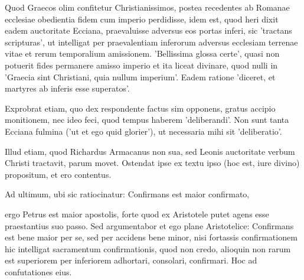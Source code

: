 Quod Graecos olim confitetur Christianissimos, postea recedentes ab Romanae ecclesiae obedientia fidem cum imperio perdidisse, idem est, quod heri dixit eadem auctoritate Ecciana, praevaluisse adversus eos portas inferi, sic 'tractans scripturas', ut intelligat per praevalentiam inferorum adversus ecclesiam terrenae vitae et rerum temporalium amissionem. 'Bellissima glossa certe', quasi non potuerit fides permanere amisso imperio et ita liceat divinare, quod nulli in 'Graecia sint Christiani, quia nullum imperium'. Eadem ratione 'diceret, et martyres ab inferis esse superatos'.

Exprobrat etiam, quo dex respondente factus sim opponens, gratus accipio monitionem, nec ideo feci, quod tempus haberem 'deliberandi'. Non sunt tanta Ecciana fulmina ('ut et ego quid glorier'), ut necessaria mihi sit 'deliberatio'.

Illud etiam, quod Richardus Armacanus non sua, sed Leonis auctoritate verbum Christi tractavit, parum movet. Ostendat ipse ex textu ipso (hoc est, iure divino) propositum, et ero contentus.

Ad ultimum, ubi sic ratiocinatur: Confirmans est maior confirmato,

ergo Petrus est maior apostolis, forte quod ex Aristotele putet agens esse praestantius suo passo. Sed argumentabor et ego plane Aristotelice: Confirmans est bene maior per se, sed per accidens bene minor, nisi fortassis confirmationem hic intelligat sacramentum confirmationis, quod non credo, alioquin non rarum est superiorem per inferiorem adhortari, consolari, confirmari. Hoc ad confutationes eius.

